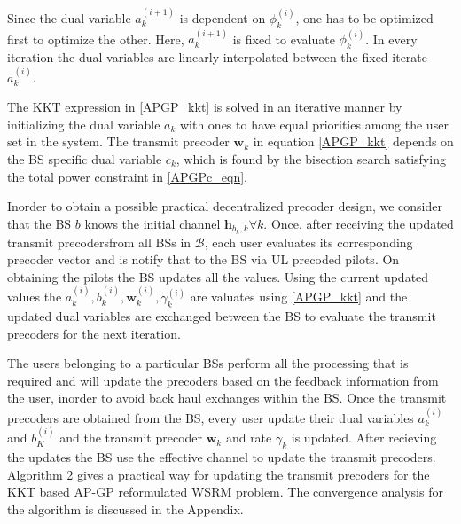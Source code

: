 \documentclass[a4paper, 12pt,titlepage]{dithesis} %
\newcommand{\me}[1]{\( #1 \)}
\begin{document}
Since the dual variable \me{a_k^{(i+1)}} is dependent on \me{\phi_k^{(i)}}, one has to be optimized first to optimize the other. Here, \me{a_k^{(i+1)}} is fixed to evaluate \me{\phi_k^{(i)}}. In every iteration the dual variables are linearly interpolated between the fixed iterate \me{a_k^{(i)}}.

The \ac{KKT} expression in \eqref{APGP_kkt} is solved in an iterative manner by initializing the dual variable \me{a_k} with ones to have equal priorities among the user set in the system. The transmit precoder \me{\mathbf{w}_k} in equation \eqref{APGP_kkt} depends on the \ac{BS} specific dual variable \me{c_k}, which is found by the bisection search satisfying the total power constraint in \eqref{APGPc_eqn}.

Inorder to obtain a possible practical decentralized precoder design, we consider that the \ac{BS} \me{b} knows the initial channel \me{\mathbf{h}_{b_k,k} \forall k}. Once, after receiving the updated transmit precodersfrom all \ac{BS}s in \me{\mathcal{B}}, each user evaluates its corresponding precoder vector and is notify that to the \ac{BS} via \ac{UL} precoded pilots. On obtaining the pilots the \ac{BS} updates all the values. Using the current updated values the \me{a_k^{(i)}, b_k^{(i)}, \mathbf{w}_k^{(i)}, \gamma_k^{(i)}} are valuates using \eqref{APGP_kkt} and the updated dual variables are exchanged between the \ac{BS} to evaluate the transmit precoders for the next iteration.

The users belonging to a particular \ac{BS}s perform all the processing that is required and will update the precoders based on the feedback information from the user, inorder to avoid back haul exchanges within the \ac{BS}. Once the transmit precoders are obtained from the \ac{BS}, every user update their dual variables \me{a_k^{(i)}} and \me{b_K^{(i)}} and the transmit precoder \me{\mathbf{w}_k} and rate \me{\gamma_k} is updated. After recieving the updates the \ac{BS} use the effective channel to update the transmit precoders. Algorithm 2 gives a practical way for updating the transmit precoders for the \ac{KKT} based AP-GP reformulated \ac{WSRM} problem. The convergence analysis for the algorithm is discussed in the Appendix.
\end{document}
